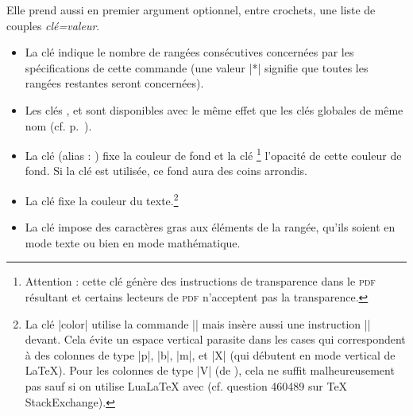 \documentclass[dvipsnames]{article}%
\begin{document}
\medskip
Elle prend aussi en premier argument optionnel, entre crochets, une liste de
couples \textsl{clé=valeur}.
\begin{itemize}
\item {}
La clé  indique le nombre de rangées consécutives concernées par
les spécifications de cette commande (une valeur |*| signifie que toutes les
rangées restantes seront concernées).
\item Les clés , 
et  sont disponibles avec le même effet que les
clés globales de même nom (cf. p.~\pageref{cell-space}).

\item 
{}
La clé  (alias : ) fixe la couleur de fond
et la clé \footnote{Attention : cette clé génère des
  instructions de transparence dans le \textsc{pdf} résultant et certains
  lecteurs de \textsc{pdf} n'acceptent pas la transparence.} l'opacité de cette
couleur de fond. Si la clé  est utilisée, ce fond
aura des coins arrondis.

\item 
{} 
La clé  fixe la couleur du texte.\footnote{La clé |color|
  utilise la commande |\color| mais insère aussi une instruction |\leavevmode|
  devant. Cela évite un espace vertical parasite dans les cases qui
  correspondent à des colonnes de type |p|, |b|, |m|, et |X| (qui débutent en
  mode vertical de LaTeX). Pour les colonnes de type |V| (de ),
  cela ne suffit malheureusement pas sauf si on utilise LuaLaTeX avec
   (cf. question 460489 sur TeX StackExchange).}

\item {}
La clé  impose des caractères gras aux éléments de la rangée, qu'ils
soient en mode texte ou bien en mode mathématique.
\end{itemize}
\end{document}
